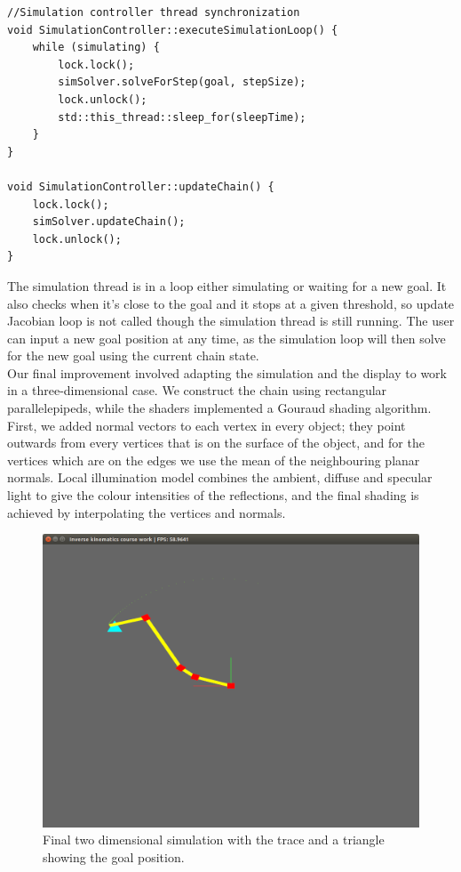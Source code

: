 \documentclass[paper=a4, fontsize=11pt]{scrartcl} %
\numberwithin{equation}{section} %
\numberwithin{figure}{section} %
\numberwithin{table}{section} %
\begin{document}
\begin{mdframed}
\begin{scriptsize}
\begin{lstlisting}
//Simulation controller thread synchronization		
void SimulationController::executeSimulationLoop() {
	while (simulating) {
		lock.lock();
		simSolver.solveForStep(goal, stepSize);
		lock.unlock();
		std::this_thread::sleep_for(sleepTime);
	}
}

void SimulationController::updateChain() {
	lock.lock();
	simSolver.updateChain();
	lock.unlock();
}
\end{lstlisting}
\end{scriptsize}
\end{mdframed}

The simulation thread is in a loop either simulating or waiting for a new goal. It also checks when it's close to the goal and it stops at a given threshold, so update Jacobian loop is not called though the simulation thread is still running. The user can input a new goal position at any time, as the simulation loop will then solve for the new goal using the current chain state.\\

Our final improvement involved adapting the simulation and the display to work in a three-dimensional case. We construct the chain using rectangular parallelepipeds, while the shaders implemented a Gouraud shading algorithm. First, we added normal vectors to each vertex in every object; they point outwards from every vertices that is on the surface of the object, and for the vertices which are on the edges we use the mean of the neighbouring planar normals. Local illumination model combines the ambient, diffuse and specular light to give the colour intensities of the reflections, and the final shading is achieved by interpolating the vertices and normals. \\
\begin{center}
\begin{figure}[h]
\includegraphics[scale=0.4]{chain2Dv2}
\caption{Final two dimensional simulation with the trace and a triangle showing the goal position.}
\end{figure}
\end{center}
\end{document}
